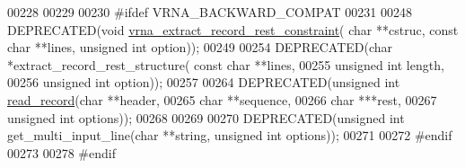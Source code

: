 \begin{DoxyCode}
00228 
00229 
00230 \textcolor{preprocessor}{#ifdef  VRNA\_BACKWARD\_COMPAT}
00231 
00248 DEPRECATED(\textcolor{keywordtype}{void} \hyperlink{file__formats_8h_a55a9ae6dfeecc1b3f0c2acf6fa796c15}{vrna\_extract\_record\_rest\_constraint}( \textcolor{keywordtype}{char} **cstruc, \textcolor{keyword}{
      const} \textcolor{keywordtype}{char} **lines, \textcolor{keywordtype}{unsigned} \textcolor{keywordtype}{int} option));
00249 
00254 DEPRECATED(\textcolor{keywordtype}{char} *extract\_record\_rest\_structure( \textcolor{keyword}{const} \textcolor{keywordtype}{char} **lines,
00255                                                 \textcolor{keywordtype}{unsigned} \textcolor{keywordtype}{int} length,
00256                                                 \textcolor{keywordtype}{unsigned} \textcolor{keywordtype}{int} option));
00257 
00264 DEPRECATED(\textcolor{keywordtype}{unsigned} \textcolor{keywordtype}{int} \hyperlink{file__formats_8h_afd194a69af9d92b5b0412a7627ac1595}{read\_record}(\textcolor{keywordtype}{char} **header,
00265                                     \textcolor{keywordtype}{char} **sequence,
00266                                     \textcolor{keywordtype}{char}  ***rest,
00267                                     \textcolor{keywordtype}{unsigned} \textcolor{keywordtype}{int} options));
00268 
00269 
00270 DEPRECATED(\textcolor{keywordtype}{unsigned} \textcolor{keywordtype}{int} get\_multi\_input\_line(\textcolor{keywordtype}{char} **\textcolor{keywordtype}{string}, \textcolor{keywordtype}{unsigned} \textcolor{keywordtype}{int} options));
00271 
00272 \textcolor{preprocessor}{#endif}
00273 
00278 \textcolor{preprocessor}{#endif}
\end{DoxyCode}
